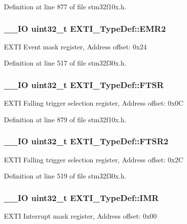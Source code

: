 Definition at line 877 of file stm32f10x.\-h.

\hypertarget{struct_e_x_t_i___type_def_a36eec4d67b3fb7a34fe555be763e2347}{
\subsubsection[{E\-M\-R2}]{\setlength{\rightskip}{0pt plus 5cm}\-\_\-\-\_\-\-I\-O {\bf uint32\-\_\-t} E\-X\-T\-I\-\_\-\-Type\-Def\-::\-E\-M\-R2}}\label{struct_e_x_t_i___type_def_a36eec4d67b3fb7a34fe555be763e2347}
E\-X\-T\-I Event mask register, Address offset\-: 0x24 

Definition at line 517 of file stm32f30x.\-h.

\hypertarget{struct_e_x_t_i___type_def_aee667dc148250bbf37fdc66dc4a9874d}{
\subsubsection[{F\-T\-S\-R}]{\setlength{\rightskip}{0pt plus 5cm}\-\_\-\-\_\-\-I\-O {\bf uint32\-\_\-t} E\-X\-T\-I\-\_\-\-Type\-Def\-::\-F\-T\-S\-R}}\label{struct_e_x_t_i___type_def_aee667dc148250bbf37fdc66dc4a9874d}
E\-X\-T\-I Falling trigger selection register, Address offset\-: 0x0\-C 

Definition at line 879 of file stm32f10x.\-h.

\hypertarget{struct_e_x_t_i___type_def_a518a0f964908240ac335bf137c2097f3}{
\subsubsection[{F\-T\-S\-R2}]{\setlength{\rightskip}{0pt plus 5cm}\-\_\-\-\_\-\-I\-O {\bf uint32\-\_\-t} E\-X\-T\-I\-\_\-\-Type\-Def\-::\-F\-T\-S\-R2}}\label{struct_e_x_t_i___type_def_a518a0f964908240ac335bf137c2097f3}
E\-X\-T\-I Falling trigger selection register, Address offset\-: 0x2\-C 

Definition at line 519 of file stm32f30x.\-h.

\hypertarget{struct_e_x_t_i___type_def_a17d061db586d4a5aa646b68495a8e6a4}{
\subsubsection[{I\-M\-R}]{\setlength{\rightskip}{0pt plus 5cm}\-\_\-\-\_\-\-I\-O {\bf uint32\-\_\-t} E\-X\-T\-I\-\_\-\-Type\-Def\-::\-I\-M\-R}}\label{struct_e_x_t_i___type_def_a17d061db586d4a5aa646b68495a8e6a4}
E\-X\-T\-I Interrupt mask register, Address offset\-: 0x00 

